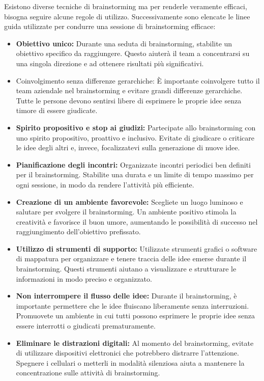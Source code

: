 \documentclass[oneside]{book}
\begin{document}
Esistono diverse tecniche di brainstorming ma per renderle veramente efficaci, bisogna seguire alcune regole di utilizzo.
Successivamente sono elencate le linee guida utilizzate per condurre una sessione di brainstorming efficace:
\begin{itemize}
    \item \textbf{Obiettivo unico:} Durante una seduta di brainstorming, stabilite un obiettivo specifico da raggiungere. Questo aiuterà il team a concentrarsi su una singola direzione e ad ottenere risultati più significativi.

 \item Coinvolgimento senza differenze gerarchiche: È importante coinvolgere tutto il team aziendale nel brainstorming e evitare grandi differenze gerarchiche. Tutte le persone devono sentirsi libere di esprimere le proprie idee senza timore di essere giudicate.

 \item \textbf{Spirito propositivo e stop ai giudizi:} Partecipate allo brainstorming con uno spirito propositivo, proattivo e inclusivo. Evitate di giudicare o criticare le idee degli altri e, invece, focalizzatevi sulla generazione di nuove idee.

 \item \textbf{Pianificazione degli incontri:} Organizzate incontri periodici ben definiti per il brainstorming. Stabilite una durata e un limite di tempo massimo per ogni sessione, in modo da rendere l'attività più efficiente.

 \item \textbf{Creazione di un ambiente favorevole:} Scegliete un luogo luminoso e salutare per svolgere il brainstorming. Un ambiente positivo stimola la creatività e favorisce il buon umore, aumentando le possibilità di successo nel raggiungimento dell'obiettivo prefissato.

 \item \textbf{Utilizzo di strumenti di supporto:} Utilizzate strumenti grafici o software di mappatura per organizzare e tenere traccia delle idee emerse durante il brainstorming. Questi strumenti aiutano a visualizzare e strutturare le informazioni in modo preciso e organizzato.

 \item \textbf{Non interrompere il flusso delle idee:} Durante il brainstorming, è importante permettere che le idee fluiscano liberamente senza interruzioni. Promuovete un ambiente in cui tutti possono esprimere le proprie idee senza essere interrotti o giudicati prematuramente.

 \item \textbf{Eliminare le distrazioni digitali:} Al momento del brainstorming, evitate di utilizzare dispositivi elettronici che potrebbero distrarre l'attenzione. Spegnere i cellulari o metterli in modalità silenziosa aiuta a mantenere la concentrazione sulle attività di brainstorming.

   
\end{itemize}
\end{document}
